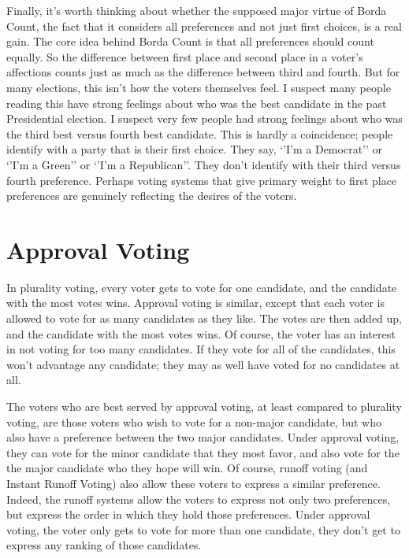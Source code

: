 \documentclass[11pt,]{article}
\begin{document}
Finally, it's worth thinking about whether the supposed major virtue of
Borda Count, the fact that it considers all preferences and not just
first choices, is a real gain. The core idea behind Borda Count is that
all preferences should count equally. So the difference between first
place and second place in a voter's affections counts just as much as
the difference between third and fourth. But for many elections, this
isn't how the voters themselves feel. I suspect many people reading this
have strong feelings about who was the best candidate in the past
Presidential election. I suspect very few people had strong feelings
about who was the third best versus fourth best candidate. This is
hardly a coincidence; people identify with a party that is their first
choice. They say, `'I'm a Democrat'' or `'I'm a Green'' or `'I'm a
Republican''. They don't identify with their third versus fourth
preference. Perhaps voting systems that give primary weight to first
place preferences are genuinely reflecting the desires of the voters.

\hypertarget{approval-voting}{%
\section{Approval Voting}\label{approval-voting}}

In plurality voting, every voter gets to vote for one candidate, and the
candidate with the most votes wins. Approval voting is similar, except
that each voter is allowed to vote for as many candidates as they like.
The votes are then added up, and the candidate with the most votes wins.
Of course, the voter has an interest in not voting for too many
candidates. If they vote for all of the candidates, this won't advantage
any candidate; they may as well have voted for no candidates at all.

The voters who are best served by approval voting, at least compared to
plurality voting, are those voters who wish to vote for a non-major
candidate, but who also have a preference between the two major
candidates. Under approval voting, they can vote for the minor candidate
that they most favor, and also vote for the the major candidate who they
hope will win. Of course, runoff voting (and Instant Runoff Voting) also
allow these voters to express a similar preference. Indeed, the runoff
systems allow the voters to express not only two preferences, but
express the order in which they hold those preferences. Under approval
voting, the voter only gets to vote for more than one candidate, they
don't get to express any ranking of those candidates.
\end{document}
